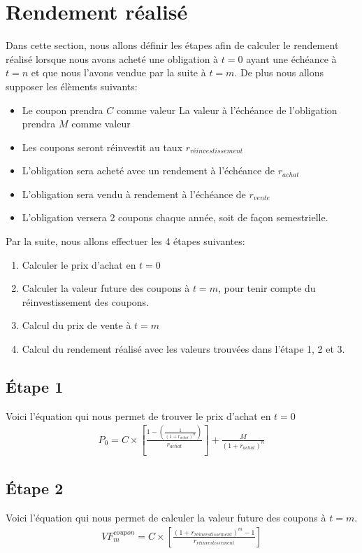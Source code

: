 \documentclass[letterpaper, 12pt]{article}
\newcommand{\1}{\mathds{1}}	%
\theoremstyle{definition}
\begin{document}
\newpage

\section{Rendement réalisé}
Dans cette section, nous allons définir les étapes afin de calculer le rendement réalisé lorsque nous avons acheté une obligation à $t=0$ ayant une échéance à $t=n$ et que nous l'avons vendue par la suite à $t=m$. De plus nous allons supposer les élèments suivants:
\begin{itemize}
\item Le coupon prendra $C$ comme valeur 
\iten La valeur à l'échéance de l'obligation prendra $M$ comme valeur
\item Les coupons seront réinvestit au taux $r_{réinvestissement}$ 
\item L'obligation sera acheté avec un rendement à l'échéance de $r_{achat}$
\item L'obligation sera vendu à rendement à l'échéance de $r_{vente}$
\item L'obligation versera 2 coupons chaque année, soit de façon semestrielle. 
\end{itemize}

 
Par la suite, nous allons effectuer les 4 étapes suivantes: 
\begin{enumerate}
\item Calculer le prix d'achat en $t=0$
\item Calculer la valeur future des coupons à $t=m$, pour tenir compte du réinvestissement des coupons.
\item Calcul du prix de vente à $t=m$
\item Calcul du rendement réalisé avec les valeurs trouvées dans l'étape 1, 2 et 3.
\end{enumerate}

\subsection{Étape 1}
Voici l'équation qui nous permet de trouver le prix d'achat en $t=0$
\begin{align*}
P_0=C \times \left[\frac{1-\left( \frac{1}{(1+r_{achat})^n}\right)}{r_{achat}} \right] +\frac{M}{(1+r_{achat})^n}
\end{align*}
\subsection{Étape 2}
Voici l'équation qui nous permet de calculer la valeur future des coupons à $t=m$.
\begin{align*}
VF_m^{coupon}=C \times \left[ \frac{(1+r_{réinvestissement})^m-1}{r_{réinvestissement}} \right]
\end{align*}
\end{document}
